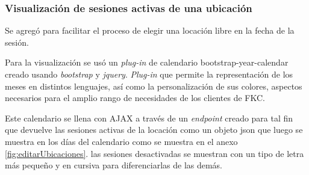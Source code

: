 \subsubsection{Visualización de sesiones activas de una ubicación}

Se agregó para facilitar el proceso de elegir una locación libre en la fecha de la sesión.

Para la visualización se usó un \emph{plug-in} de calendario bootstrap-year-calendar creado usando \emph{bootstrap} y \emph{jquery}. \emph{Plug-in} que permite la representación de los meses en distintos lenguajes, así como la personalización de sus colores, aspectos necesarios para el amplio rango de necesidades de los clientes de FKC.

Este calendario se llena con AJAX a través de un \emph{endpoint} creado para tal fin que devuelve las sesiones activas de la locación como un objeto json que luego se muestra en los días del calendario como se muestra en el anexo \ref{fig:editarUbicaciones}. las sesiones desactivadas se muestran con un tipo de letra más pequeño y en cursiva para diferenciarlas de las demás.

